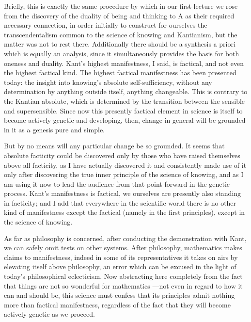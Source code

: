 Briefly, this is exactly the same procedure by which in our first lecture
we rose from the discovery of the duality of being and thinking to A
as their required necessary connection, in order initially to construct
for ourselves the transcendentalism common to the science of knowing
and Kantianism, but the matter was not to rest there.
Additionally there should be a synthesis a priori
which is equally an analysis,
since it simultaneously provides
the basis for both oneness and duality.
Kant's highest manifestness, I said, is factical,
and not even the highest factical kind.
The highest factical manifestness has been presented today:
the insight into knowing's absolute self-sufficiency,
without any determination by anything outside itself,
anything changeable.
This is contrary to the Kantian absolute,
which is determined by the transition
between the sensible and supersensible.
Since now this presently factical element in science
is itself to become actively genetic and developing,
then, change in general will be grounded in it
as a genesis pure and simple.

But by no means will any particular change be so grounded.
It seems that absolute facticity could be discovered only
by those who have raised themselves above all facticity,
as I have actually discovered it and consistently
made use of it only after discovering the true
inner principle of the science of knowing,
and as I am using it now to lead the audience
from that point forward in the genetic process.
Kant's manifestness is factical,
we ourselves are presently also standing in facticity;
and I add that everywhere in the scientific world
there is no other kind of manifestness except the factical
(namely in the first principles),
except in the science of knowing.

As far as philosophy is concerned,
after conducting the demonstration with Kant,
we can safely omit tests on other systems.
After philosophy, mathematics makes claims to manifestness,
indeed in some of its representatives it takes on airs
by elevating itself above philosophy,
an error which can be excused in the light of
today's philosophical eclecticism.
Now abstracting here completely from the fact
that things are not so wonderful for mathematics
—not even in regard to how it can and should be,
this science must confess that its principles admit
nothing more than factical manifestness,
regardless of the fact that they will become
actively genetic as we proceed.

